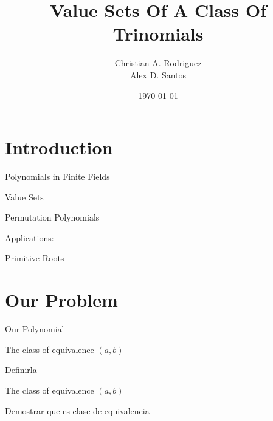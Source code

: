 \documentclass{beamer}
\title
{Value Sets Of A Class Of Trinomials}
\author
{Christian A. Rodriguez\\
Alex D. Santos}
\institute[]
{
  Department of Computer Science\\
  University of Puerto Rico, Rio Piedras
}
\date
{\today}
\begin{document}
\begin{frame}
  \titlepage
\end{frame}


\section{Introduction} %
\label{sec:introduction}



\begin{frame}{Polynomials in Finite Fields}


\end{frame}

\begin{frame}{Value Sets}


\end{frame}

\begin{frame}{Permutation Polynomials}


Applications: 

\end{frame}


\begin{frame}{Primitive Roots}


\end{frame}


\section{Our Problem} %
\label{sec:our_problem}


\begin{frame}{Our Polynomial}
  

\end{frame}

\begin{frame}{The class of equivalence $(a,b)$}
  
  Definirla

\end{frame}

\begin{frame}{The class of equivalence $(a,b)$}
  
  Demostrar que es clase de equivalencia

\end{frame}
\end{document}
